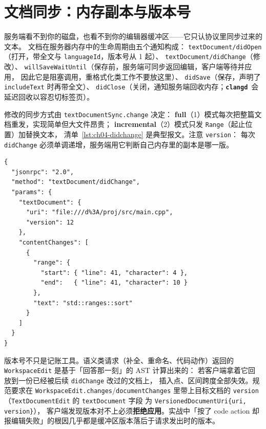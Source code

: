 \documentclass[12pt,a4paper,fontset=fandol]{ctexbook}
\newcommand{\Bk}{\discretionary{}{}{}}
\newcommand{\Lib}[1]{\textbf{\texttt{#1}}}
\newcommand{\CD}{\Lib{clangd}}
\begin{document}
\section{文档同步：内存副本与版本号}\label{sec:ch04-s3}

服务端看不到你的磁盘，也看不到你的编辑器缓冲区——它只认协议里同步过来的文本。
文档在服务器内存中的生命周期由五个通知构成：
\texttt{textDocument/didOpen}（打开，带全文与 \texttt{languageId}，版本号从 1 起）、
\texttt{textDocument/didChange}（修改）、
\texttt{willSaveWaitUntil}（保存前，服务端可同步返回编辑，客户端等待并应用，
因此它是阻塞调用，重格式化类工作不要放这里）、
\texttt{didSave}（保存，声明了 \texttt{includeText} 时再带全文）、
\texttt{didClose}（关闭，通知服务端回收内存；\CD\ 会延迟回收以容忍切标签页）。

修改的同步方式由 \texttt{textDocumentSync.change} 决定：
\textbf{full}（1）模式每次把整篇文档重发，实现简单但大文件昂贵；
\textbf{incremental}（2）模式只发 \texttt{Range}（起止位置）加替换文本，
清单~\ref{lst:ch04-didchange} 是典型报文。注意 \texttt{version}：
每次 \texttt{didChange} 必须单调递增，服务端用它判断自己内存里的副本是哪一版。

\begin{lstlisting}[style=jsonstyle,caption={incremental 同步下的 didChange 通知},label={lst:ch04-didchange}]
{
  "jsonrpc": "2.0",
  "method": "textDocument/didChange",
  "params": {
    "textDocument": {
      "uri": "file:///d%3A/proj/src/main.cpp",
      "version": 12
    },
    "contentChanges": [
      {
        "range": {
          "start": { "line": 41, "character": 4 },
          "end":   { "line": 41, "character": 10 }
        },
        "text": "std::ranges::sort"
      }
    ]
  }
}
\end{lstlisting}

版本号不只是记账工具。语义类请求（补全、重命名、代码动作）返回的
\texttt{Workspace{\Bk}Edit} 是基于「回答那一刻」的 AST 计算出来的：
若客户端拿着它回放到一份已经被后续 \texttt{didChange} 改过的文档上，
插入点、区间跨度全部失效。规范要求在
\texttt{Workspace{\Bk}Edit.changes}/{\Bk}\texttt{document{\Bk}Changes} 里带上目标文档的
\texttt{version}（\texttt{Text{\Bk}Document{\Bk}Edit} 的 \texttt{text{\Bk}Document} 字段
为 \texttt{Versioned{\Bk}Document{\Bk}Uri\{uri, version\}}），
客户端发现版本对不上必须\textbf{拒绝应用}。实战中「按了 code action
却报编辑失败」的根因几乎都是缓冲区版本落后于请求发出时的版本。

\end{document}
